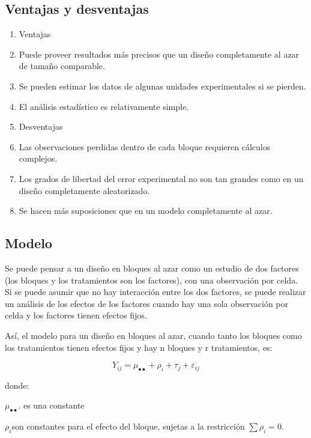 \documentclass[]{book}
\theoremstyle{definition}
\theoremstyle{definition}
\theoremstyle{definition}
\theoremstyle{remark}
\begin{document}
\hypertarget{ventajas-y-desventajas}{%
\subsection{Ventajas y desventajas}\label{ventajas-y-desventajas}}

\begin{enumerate}
\def\labelenumi{\arabic{enumi}.}
\item
  Ventajas
\item
  Puede proveer resultados más precisos que un diseño completamente al
  azar de tamaño comparable.
\item
  Se pueden estimar los datos de algunas unidades experimentales si se
  pierden.
\item
  El análisis estadístico es relativamente simple.
\item
  Desventajas
\item
  Las observaciones perdidas dentro de cada bloque requieren cálculos
  complejos.
\item
  Los grados de libertad del error experimental no son tan grandes como
  en un diseño completamente aleatorizado.
\item
  Se hacen más suposiciones que en un modelo completamente al azar.
\end{enumerate}

\hypertarget{modelo}{%
\subsection{Modelo}\label{modelo}}

Se puede pensar a un diseño en bloques al azar como un estudio de dos
factores (los bloques y los tratamientos son los factores), con una
observación por celda. Si se puede asumir que no hay interacción entre
los dos factores, se puede realizar un análisis de los efectos de los
factores cuando hay una sola observación por celda y los factores tienen
efectos fijos.

Así, el modelo para un diseño en bloques al azar, cuando tanto los
bloques como los tratamientos tienen efectos fijos y hay n bloques y r
tratamientos, es:

\[
Y_{ij} = \mu_{\bullet \bullet} + \rho_{i} + \tau_{j} + \varepsilon_{ij}
\]

donde:

\(\mu_{\bullet \bullet}\). es una constante

\(\rho_{i}\)son constantes para el efecto del bloque, sujetas a la
restricción \(\sum\rho_{i} = 0\).
\end{document}
